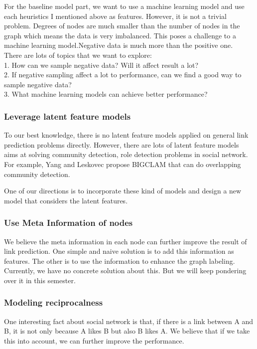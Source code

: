 \documentclass[paper=letter, fontsize=12pt]{scrartcl} %
\begin{document}
	For the baseline model part, we want to use a machine learning model and use each heuristics I mentioned above as features. However, it is not a trivial problem. Degrees of nodes are much smaller than the number of nodes in the graph which means the data is very imbalanced. This poses a challenge to a machine learning model.Negative data is much more than the positive one.\\
	There are lots of topics that we want to explore: \\
	1. How can we sample negative data? Will it affect result a lot? \\
	2. If negative sampling affect a lot to performance, can we find a good way to sample negative data? \\
	3. What machine learning models can achieve better performance? \\
	
	\subsubsection {Leverage latent feature models}
	To our best knowledge, there is no latent feature models applied on general link prediction problems directly. However, there are lots of latent feature models aims at solving community detection, role detection problems in social network. For example, Yang and Leskovec \cite{bigclam} propose BIGCLAM that can do overlapping community detection. 
	
	One of our directions is to incorporate these kind of models and design a new model that considers the latent features. 
	
	\subsubsection {Use Meta Information of nodes}
	We believe the meta information in each node can further improve the result of link prediction. One simple and naive solution is to add this information as features. The other is to use the information to enhance the graph labeling. Currently, we have no concrete solution about this. But we will keep pondering over it in this semester.
	
	\subsubsection {Modeling reciprocalness}
	One interesting fact about social network is that, if there is a link between A and B, it is not only because A likes B but also B likes A. We believe that if we take this into account, we can further improve the performance.
	
	
	
	
	
	
	
\end{document}

